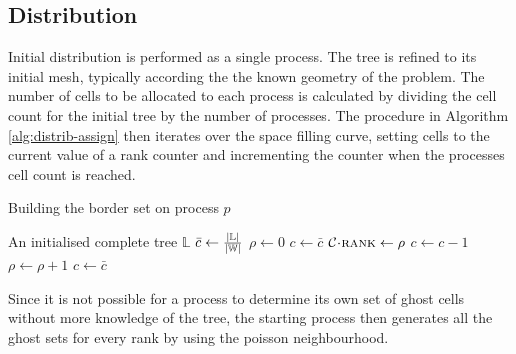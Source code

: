 \documentclass{IIBproject}
\newcommand{\acc}{{\mkern 0.5mu\cdot\mkern 0.5mu}}
\numberwithin{figure}{section}
\begin{document}


    \subsection{Distribution} %
        \label{sec:distribution}

        Initial distribution is performed as a single process. The tree is refined to its initial mesh, typically according the the known geometry of the problem. The number of cells to be allocated to each process is calculated by dividing the cell count for the initial tree by the number of processes. The procedure in Algorithm \ref{alg:distrib-assign} then iterates over the space filling curve, setting cells to the current value of a rank counter and incrementing the counter when the processes cell count is reached.

        \begin{algorithm}[H]
            \caption{Building the border set on process $p$}
            \label{alg:distrib-assign}

            \begin{algorithmic}
                \Require An initialised complete tree $\mathbb{L}$
                \Statex
                \State $\bar{c} \gets \frac{\abs{\mathbb{L}}}{\abs{\mathbb{W}}}$ 
                \State $\rho \gets 0$ 
                \State $c \gets \bar c$ 
                    \State $\mathcal{C}\acc\textproc{rank} \gets \rho$
                    \State $c \gets c-1$
                     
                        \State $\rho \gets \rho+1$
                        \State $c \gets \bar c$
                    \EndIf
                \EndFor
            \end{algorithmic}
        \end{algorithm}

        Since it is not possible for a process to determine its own set of ghost cells without more knowledge of the tree, the starting process then generates all the ghost sets for every rank by using the poisson neighbourhood.
\end{document}
